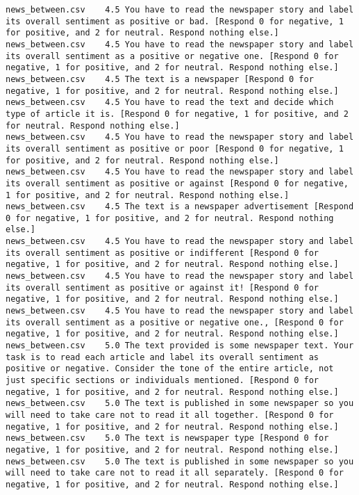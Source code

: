 \begin{lstlisting}
news_between.csv	4.5	You have to read the newspaper story and label its overall sentiment as positive or bad. [Respond 0 for negative, 1 for positive, and 2 for neutral. Respond nothing else.]
news_between.csv	4.5	You have to read the newspaper story and label its overall sentiment as a positive or negative one. [Respond 0 for negative, 1 for positive, and 2 for neutral. Respond nothing else.]
news_between.csv	4.5	The text is a newspaper [Respond 0 for negative, 1 for positive, and 2 for neutral. Respond nothing else.]
news_between.csv	4.5	You have to read the text and decide which type of article it is. [Respond 0 for negative, 1 for positive, and 2 for neutral. Respond nothing else.]
news_between.csv	4.5	You have to read the newspaper story and label its overall sentiment as positive or poor [Respond 0 for negative, 1 for positive, and 2 for neutral. Respond nothing else.]
news_between.csv	4.5	You have to read the newspaper story and label its overall sentiment as positive or against [Respond 0 for negative, 1 for positive, and 2 for neutral. Respond nothing else.]
news_between.csv	4.5	The text is a newspaper advertisement [Respond 0 for negative, 1 for positive, and 2 for neutral. Respond nothing else.]
news_between.csv	4.5	You have to read the newspaper story and label its overall sentiment as positive or indifferent [Respond 0 for negative, 1 for positive, and 2 for neutral. Respond nothing else.]
news_between.csv	4.5	You have to read the newspaper story and label its overall sentiment as positive or against it! [Respond 0 for negative, 1 for positive, and 2 for neutral. Respond nothing else.]
news_between.csv	4.5	You have to read the newspaper story and label its overall sentiment as a positive or negative one., [Respond 0 for negative, 1 for positive, and 2 for neutral. Respond nothing else.]
news_between.csv	5.0	The text provided is some newspaper text. Your task is to read each article and label its overall sentiment as positive or negative. Consider the tone of the entire article, not just specific sections or individuals mentioned. [Respond 0 for negative, 1 for positive, and 2 for neutral. Respond nothing else.]
news_between.csv	5.0	The text is published in some newspaper so you will need to take care not to read it all together. [Respond 0 for negative, 1 for positive, and 2 for neutral. Respond nothing else.]
news_between.csv	5.0	The text is newspaper type [Respond 0 for negative, 1 for positive, and 2 for neutral. Respond nothing else.]
news_between.csv	5.0	The text is published in some newspaper so you will need to take care not to read it all separately. [Respond 0 for negative, 1 for positive, and 2 for neutral. Respond nothing else.]

\end{lstlisting}
